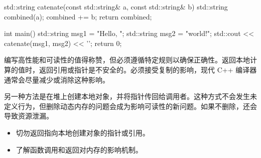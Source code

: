 
\begin{cpp}
std::string catenate(const std::string& a, const std::string& b) {
  std::string combined(a);
  combined += b;
  return combined;
}

int main() {
  std::string msg1 = "Hello, ";
  std::string msg2 = "world!";
  std::cout << catenate(msg1, msg2) << '\n';
  return 0;
}
\end{cpp}

编写高性能和可读性的值得称赞，但必须遵循特定规则以确保正确性。返回本地计算的值时，返回引用或指针是不安全的。必须接受复制的影响，现代 C++ 编译器通常会尽量减少或消除这种影响。

另一种方法是在堆上创建本地对象，并将指针传回给调用者。这种方式不会发生未定义行为，但删除动态内存的问题会成为影响可读性的新问题。如果不删除，还会导致资源泄漏。


\begin{itemize}
\item
切勿返回指向本地创建对象的指针或引用。

\item
了解函数调用和返回对内存的影响机制。
\end{itemize}
















